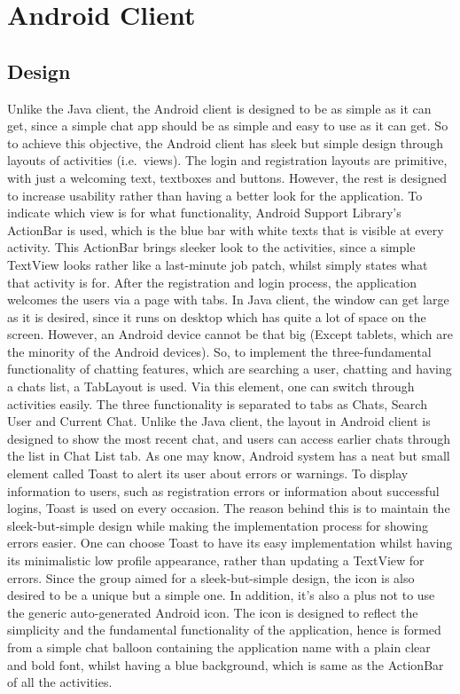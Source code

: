 \documentclass[11pt,a4paper]{report}
\begin{document}
\section{Android Client}

\subsection{Design}
Unlike the Java client, the Android client is designed to be as simple as it can get, since a simple chat app should be as simple and easy to use as it can get. So to achieve this objective, the Android client has sleek but simple design through layouts of activities (i.e.\ views).
The login and registration layouts are primitive, with just a welcoming text, textboxes and buttons. However, the rest is designed to increase usability rather than having a better look for the application.
To indicate which view is for what functionality, Android Support Library’s ActionBar is used, which is the blue bar with white texts that is visible at every activity. This ActionBar brings sleeker look to the activities, since a simple TextView looks rather like a last-minute job patch, whilst simply states what that activity is for.
After the registration and login process, the application welcomes the users via a page with tabs. In Java client, the window can get large as it is desired, since it runs on desktop which has quite a lot of space on the screen. However, an Android device cannot be that big (Except tablets, which are the minority of the Android devices). So, to implement the three-fundamental functionality of chatting features, which are searching a user, chatting and having a chats list, a TabLayout is used. Via this element, one can switch through activities easily. The three functionality is separated to tabs as Chats, Search User and Current Chat. Unlike the Java client, the layout in Android client is designed to show the most recent chat, and users can access earlier chats through the list in Chat List tab.
As one may know, Android system has a neat but small element called Toast to alert its user about errors or warnings. To display information to users, such as registration errors or information about successful logins, Toast is used on every occasion. The reason behind this is to maintain the sleek-but-simple design while making the implementation process for showing errors easier. One can choose Toast to have its easy implementation whilst having its minimalistic low profile appearance, rather than updating a TextView for errors.
Since the group aimed for a sleek-but-simple design, the icon is also desired to be a unique but a simple one. In addition, it’s also a plus not to use the generic auto-generated Android icon. The icon is designed to reflect the simplicity and the fundamental functionality of the application, hence is formed from a simple chat balloon containing the application name with a plain clear and bold font, whilst having a blue background, which is same as the ActionBar of all the activities.
\end{document}
